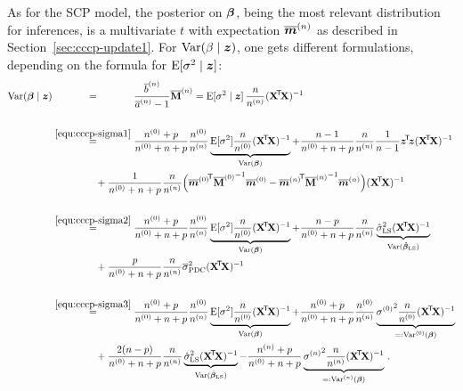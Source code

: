 As for the SCP model, the posterior on $\boldsymbol{\beta}$,
being the most relevant distribution for inferences, is a multivariate $t$
with expectation $\overline{{\bm m}}^{(n)}$ as described in Section~\ref{sec:cccp-update1}.
For $\operatorname{Var}(\beta\mid {\bm z})$, one gets different formulations, depending
on the formula for $\operatorname{E}[\sigma^2\mid {\bm z}]$:
\begin{align}
\V(\bbeta\mid \z)
                   &\stackrel{\phantom{\eqref{equ:cccp-sigma1}}}{=}
  \frac{\tbn}{\tan - 1} \tMn %
     = \E[\sigma^2\mid \z]\, \frac{n}{\nn}(\XtX)^{-1} \label{equ:cccp-varbeta} \\
\nonumber\\
                   &\stackrel{\eqref{equ:cccp-sigma1}}{=}
  \frac{\nz + p}{\nz + n + p} \frac{\nz}{\nn} \underbrace{\E[\sigma^2] \frac{n}{\nz} (\XtX)^{-1}}_{\V(\bbeta)}
    + \frac{n-1}{\nz + n + p}   \frac{n}{\nn} \frac{1}{n-1} \ztz (\XtX)^{-1} \nonumber\\ & \hspace*{10ex}
      + \frac{1}{\nz + n + p}   \frac{n}{\nn} \Big( {\tmz}^\tra {\tMz}^{-1} \tmz
                                                      - {\tmn}^\tra {\tMn}^{-1} \tmn \Big) (\XtX)^{-1} \nonumber\\
\nonumber\\
                   &\stackrel{\eqref{equ:cccp-sigma2}}{=}
  \frac{\nz + p}{\nz + n + p} \frac{\nz}{\nn} \underbrace{\E[\sigma^2] \frac{n}{\nz} (\XtX)^{-1}}_{\V(\bbeta)}
 +\frac{n - p}  {\nz + n + p}   \frac{n}{\nn} \underbrace{\sls (\XtX)^{-1}}_{\V(\bls)} \nonumber\\ & \hspace*{10ex}
 +\frac{p}      {\nz + n + p}   \frac{n}{\nn} \tspdc (\XtX)^{-1} \nonumber\\
\nonumber\\
                   &\stackrel{\eqref{equ:cccp-sigma3}}{=}
  \frac{\nz + p} {\nz + n + p} \frac{\nz}{\nn} \underbrace{\E[\sigma^2] \frac{n}{\nz} (\XtX)^{-1}}_{\V(\bbeta)}
 +\frac{\nz + p} {\nz + n + p} \frac{\nz}{\nn} \underbrace{{\sigma\uz}^2 \frac{n}{\nz} (\XtX)^{-1}}_{=:\V\uz(\bbeta)} \nonumber\\ & \hspace*{10ex}
 +\frac{2(n - p)}{\nz + n + p}   \frac{n}{\nn} \underbrace{\sls (\XtX)^{-1}}_{\V(\bls)}
 -\frac{\nn + p} {\nz + n + p}                 \underbrace{{\sigma\un}^2 \frac{n}{\nn} (\XtX)^{-1}}_{=:\V\un(\bbeta)} \,. \nonumber
\end{align}

